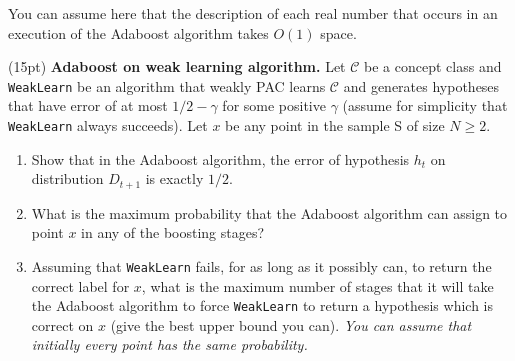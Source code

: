 \documentclass[11pt]{article}
\newcommand*{\C}{{\mathcal C}}
\DeclareMathOperator{\1}{\mathbbm{1}}
\begin{document}
\begin{hint}
    You can assume here that the description of each real number that occurs in an execution of the Adaboost algorithm takes $O(1)$ space.
\end{hint}






\begin{problem}(15pt) \textbf{Adaboost on weak learning algorithm.}  
Let $\C$ be a concept class and {\tt WeakLearn} be an algorithm that weakly PAC
learns $\C$ and generates hypotheses that have error of at most $1/2-\gamma$
for some positive $\gamma$ (assume for simplicity that {\tt WeakLearn} always
succeeds). Let $x$ be any point in the sample S of size $N \geq 2$.
\begin{enumerate}
\item Show that in the Adaboost algorithm, the error of hypothesis $h_t$ on
distribution $D_{t+1}$ is exactly $1/2.$
\item What is the maximum probability that the Adaboost algorithm can assign to
point $x$ in any of the boosting stages?
\item Assuming  that {\tt WeakLearn} fails, for as long as it possibly can, to
return the correct label for $x$, what is the maximum number of stages that it
will take the Adaboost algorithm to force  {\tt WeakLearn} to return a
hypothesis which is correct on $x$ (give the best upper bound you can). {\em You
can assume that initially every point has the same probability.}
\end{enumerate}
\end{problem}





\end{document}
